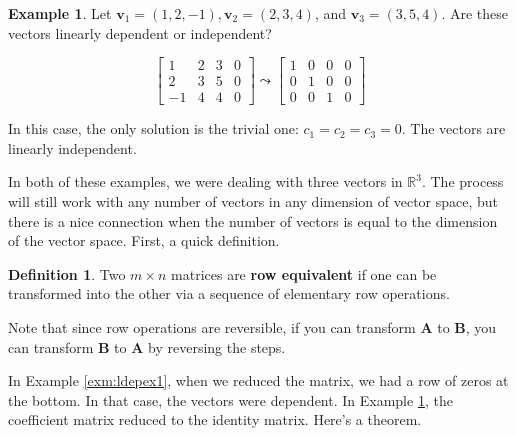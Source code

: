 \documentclass[
]{book}
\theoremstyle{definition}
\newtheorem{definition}{Definition}[chapter]
\theoremstyle{definition}
\newtheorem{example}{Example}[chapter]
\theoremstyle{definition}
\theoremstyle{definition}
\theoremstyle{remark}
\begin{document}
\begin{examplebox}

\begin{example}
\protect\hypertarget{exm:lindex2}{}\label{exm:lindex2}Let \(\mathbf{v}_1=(1,2,-1),\mathbf{v}_2=(2,3,4)\), and \(\mathbf{v}_3=(3,5,4)\). Are these vectors linearly dependent or independent?

\[\left[\begin{array}{rrr|r}1 & 2 & 3 & 0\\2 & 3 & 5 & 0\\-1 & 4 & 4 & 0\end{array}\right]\leadsto \left[\begin{array}{rrr|r}1 & 0 & 0 & 0\\0 & 1 & 0 & 0\\0 & 0 & 1 & 0\end{array}\right]\]

In this case, the only solution is the trivial one: \(c_1=c_2=c_3=0\). The vectors are linearly independent.
\end{example}

\end{examplebox}

In both of these examples, we were dealing with three vectors in \(\mathbb{R}^3\). The process will still work with any number of vectors in any dimension of vector space, but there is a nice connection when the number of vectors is equal to the dimension of the vector space. First, a quick definition.

\begin{defbox}

\begin{definition}
Two \(m\times n\) matrices are \textbf{row equivalent} if one can be transformed into the other via a sequence of elementary row operations.
\end{definition}

\end{defbox}

Note that since row operations are reversible, if you can transform \(\mathbf{A}\) to \(\mathbf{B}\), you can transform \(\mathbf{B}\) to \(\mathbf{A}\) by reversing the steps.

In Example \ref{exm:ldepex1}, when we reduced the matrix, we had a row of zeros at the bottom. In that case, the vectors were dependent. In Example \ref{exm:lindex2}, the coefficient matrix reduced to the identity matrix. Here's a theorem.
\end{document}
